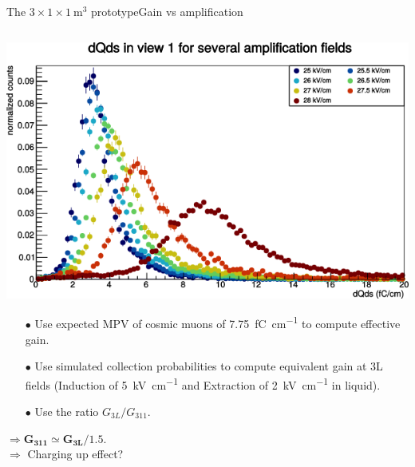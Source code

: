 \documentclass[10pt]{beamer}
\begin{document}
    
    \begin{frame}{The \texorpdfstring{$3 \times 1 \times \SI{1}{\meter\cubed}$}{311} prototype}{Gain vs amplification}
    	\begin{scriptsize}
	    	\begin{columns}
	    		\begin{column}{0.5\textwidth}
	    			\includegraphics[width=\textwidth]{figures/311/dQds_gain.png}\\
	    			\vfill
	    			\begin{itemize}
	    				\item[$\bullet$] Use expected MPV of cosmic muons of \SI{7.75}{\femto\coulomb\per\centi\meter} to compute effective gain.
	    				\item[$\bullet$] Use simulated collection probabilities to compute equivalent gain at 3L fields (Induction of \SI{5}{\kilo\volt\per\centi\meter} and Extraction of \SI{2}{\kilo\volt\per\centi\meter} in liquid).
	    				\item[$\bullet$] Use the ratio $G_{3L}/G_{311}$.
	    			\end{itemize}
	    			$\mathbf{\Rightarrow G_{311} \boldsymbol{\simeq} G_{3L}/1.5}$.\\
	    			$\Rightarrow$ Charging up effect?\\

\end{column}
\end{columns}
\end{scriptsize}
\end{frame}
\end{document}
